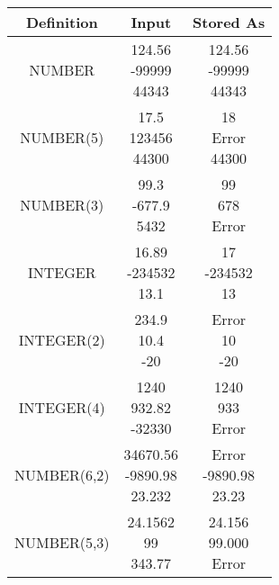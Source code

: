 \begin{center}
\begin{tabular}{|c|c|c|}
    \hline
    Definition & Input & Stored As \\
    \hline
    NUMBER  & \makecell{124.56\\-99999\\44343} & \makecell{124.56\\-99999\\44343} \\
    \hline
    NUMBER(5) & \makecell{17.5\\123456\\44300} & \makecell{18\\Error\\44300} \\
    \hline
    NUMBER(3) & \makecell{99.3\\-677.9\\5432} & \makecell{99\\678\\Error}\\
    \hline
    INTEGER  & \makecell{16.89\\-234532\\13.1} & \makecell{17\\-234532\\13} \\
    \hline
    INTEGER(2)  &   \makecell{234.9\\10.4\\-20} & \makecell{Error\\10\\-20}    \\
    \hline
    INTEGER(4)  &  \makecell{1240\\932.82\\-32330} & \makecell{1240\\933\\Error}  \\
    \hline
    NUMBER(6,2)  &  \makecell{34670.56\\-9890.98\\23.232} & \makecell{Error\\-9890.98\\23.23}  \\
    \hline
    NUMBER(5,3) &  \makecell{24.1562\\99\\343.77} & \makecell{24.156\\99.000\\Error} \\
    \hline
\end{tabular}
\end{center}

